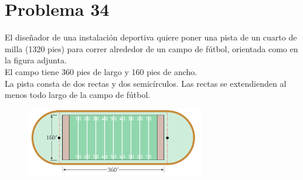 \documentclass[12pt]{article}
\begin{document}
\section{Problema 34}
El diseñador de una instalación deportiva quiere poner una pista de un cuarto de milla (1320 pies) para correr alrededor de un campo de fútbol, orientada como en la figura adjunta. \\

El campo tiene 360 pies de largo y 160 pies de ancho.\\

La pista consta de dos rectas y dos semicírculos. Las rectas  se extendienden al menos todo largo de la campo de fútbol.
\begin{figure}[h]
\centering
\includegraphics[width=0.7\textwidth]{img/fut.png}
\end{figure}
\end{document}
